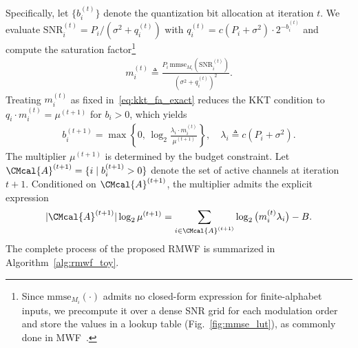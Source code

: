 \documentclass[10pt, twocolumn, comsoc]{IEEEtran}
\begin{document}
Specifically, let $\{b_i^{(t)}\}$ denote the quantization bit allocation at iteration $t$. We evaluate $\mathrm{SNR}_i^{(t)} = P_i/(\sigma^2 + q_i^{(t)})$ 
with $q_i^{(t)} = c (P_i+\sigma^2) \cdot 2^{-b_i^{(t)}}$ and compute the saturation factor\footnote{Since 
$\mathrm{mmse}_{M_i}(\cdot)$ admits no closed-form expression for finite-alphabet inputs, we precompute it over a dense SNR grid for each modulation order and store the values in a lookup table (Fig.~\ref{fig:mmse_lut}), as commonly done in MWF~\cite{LozanoTulinoVerdu}.}
\begin{align} \label{eq:mercury_update}
  m_i^{(t)} \triangleq 
  \frac{P_i \, \mathrm{mmse}_{M_i}(\mathrm{SNR}_i^{(t)})}{(\sigma^2 + q_i^{(t)})^2} .
\end{align}
Treating $m_i^{(t)}$ as fixed in~\eqref{eq:kkt_fa_exact} reduces the KKT condition to $q_i \cdot m_i^{(t)} = \mu^{(t+1)}$ for $b_i>0$, which yields
\begin{align} \label{eq:bit_update_fa}
b_i^{(t+1)} = 
\max\left\{
0 ,\, 
\log_2{\frac{\lambda_i \cdot m_i^{(t)}}{\mu^{(t+1)}}}
\right\},
\quad
\lambda_i \triangleq c(P_i + \sigma^2).
\end{align}
The multiplier $\mu^{(t+1)}$ is determined by the budget constraint. Let $\CMcal{A}^{(t+1)} = \{i \mid b_i^{(t+1)} > 0\}$ denote the set of active channels at iteration $t+1$. Conditioned on $\CMcal{A}^{(t+1)}$, the multiplier admits the explicit expression
\begin{align} \label{eq:mu_update_fa}
    |\CMcal{A}^{(t+1)}|\log_2 \mu^{(t+1)} 
    = \sum_{i \in \CMcal{A}^{(t+1)}} \log_2 \big( m_i^{(t)} \lambda_i \big) - B.
\end{align}
The complete process of the proposed RMWF is summarized in Algorithm~\ref{alg:rmwf_toy}.



\end{document}
